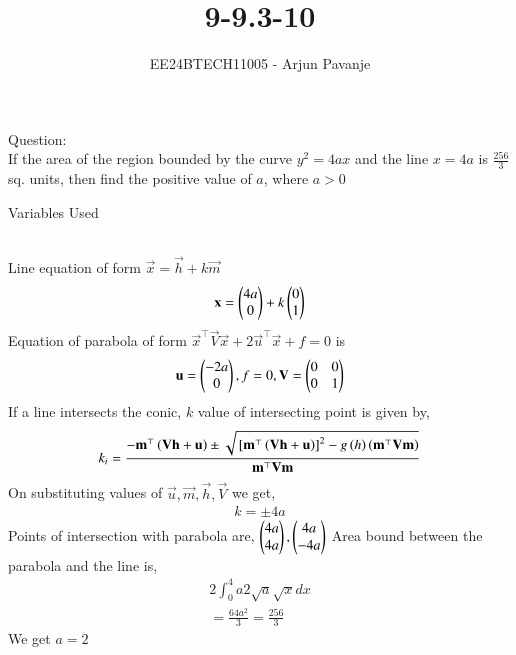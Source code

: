 \documentclass[journal]{IEEEtran}
\begin{document}

\vspace{3cm}

\title{9-9.3-10}
\author{EE24BTECH11005 - Arjun Pavanje}
{\let\newpage\relax\maketitle}
Question:\\
If the area of the region bounded by the curve $y^2=4ax$ and the line $x=4a$ is $\frac{256}{3}$ sq. units, then find the positive value of $a$, where $a>0$
\begin{table}[h!]    
  \centering
  
  \caption{Variables Used}
  \label{tab1-1.9-6}
\end{table}\\
\solution
Line equation of form $\vec{x}=\vec{h}+k\vec{m}$
\begin{align}
\mathbf{x}=\begin{pmatrix}4a\\0\end{pmatrix}+k\begin{pmatrix}0\\1\end{pmatrix}
\end{align}
Equation of parabola of form $\vec{x}^{\top}\vec{V}\vec{x}+2\vec{u}^{\top}\vec{x}+f=0$ is
\begin{align}
	\mathbf{u}=\begin{pmatrix}-2a\\0\end{pmatrix},f=0,\mathbf{V}=\begin{pmatrix}0&0\\0&1\end{pmatrix}
\end{align}
If a line intersects the conic, $k$ value of intersecting point is given by,
\begin{align}
	k_i=\frac{-\mathbf{m}^{\top}\left(\mathbf{Vh}+\mathbf{u}\right)\pm\sqrt{{}\left[\mathbf{m}^{\top}\left(\mathbf{Vh}+\mathbf{u}\right)\right]^2-g\left(h\right)\left(\mathbf{m}^{\top}\mathbf{Vm}\right)}}{\mathbf{m}^{\top}\mathbf{Vm}}
\end{align}
On substituting values of $\vec{u},\vec{m},\vec{h},\vec{V}$ we get,
\begin{align}
	k=\pm4a
\end{align}
Points of intersection with parabola are, $\begin{pmatrix}4a\\4a\end{pmatrix},\begin{pmatrix}4a\\-4a\end{pmatrix}$
Area bound between the parabola and the line is,
\begin{align}
	2\int_0^4a 2\sqrt{a}\sqrt{x}dx\\
	=\frac{64a^2}{3}=\frac{256}{3}
\end{align}
We get $a=2$\\
\end{document}
